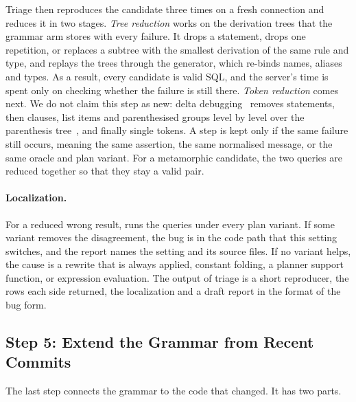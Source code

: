 Triage then reproduces the candidate three times on a fresh connection and
reduces it in two stages. \emph{Tree reduction} works on the derivation trees
that the grammar arm stores with every failure. It drops a statement, drops one
repetition, or replaces a subtree with the smallest derivation of the same rule
and type, and replays the trees through the generator, which re-binds names,
aliases and types. As a result, every candidate is valid SQL, and the server's
time is spent only on checking whether the failure is still there. \emph{Token
reduction} comes next. We do not claim this step as new: delta
debugging~\cite{zeller2002dd} removes statements,
then clauses, list items and parenthesised groups level by level over the
parenthesis tree~\cite{misherghi2006hdd}, and finally single tokens. A step is
kept only if the same failure still occurs, meaning the same assertion, the same
normalised message, or the same oracle and plan variant. For a metamorphic
candidate, the two queries are reduced together so that they stay a valid pair.

\paragraph{Localization.} For a reduced wrong result, \tool runs the queries
under every plan variant. If some variant removes the disagreement, the bug is
in the code path that this setting switches, and the report names the setting
and its source files. If no variant helps, the cause is a rewrite that is always
applied, constant folding, a planner support function, or expression evaluation.
The output of triage is a short reproducer, the rows each side returned, the
localization and a draft report in the format of the \pg bug form.

\subsection{Step 5: Extend the Grammar from Recent Commits}
\label{sec:llm}

The last step connects the grammar to the code that changed. It has two parts.

